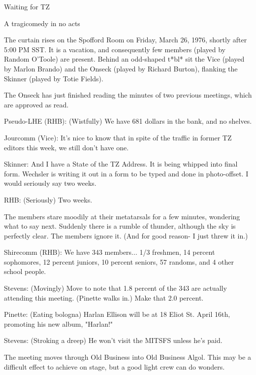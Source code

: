 \documentclass[12pt]{article}
\begin{document}
\begin{center}

Waiting for TZ

A tragicomedy in no acts

\end{center}
 
\vspace{12pt}

\setlength{\parskip}{6pt}

\noindent
The curtain rises on the Spofford Room on Friday, March 26, 1976, shortly after 5:00 PM SST. It is a vacation, and consequently few members (played by Random O'Toole) are present. Behind an odd-shaped t*bl* sit the Vice (played by Marlon Brando) and the Onseck (played by Richard Burton), flanking the Skinner (played by Totie Fields).

The Onseck has just finished reading the minutes of two previous meetings, which are approved as read.

Pseudo-LHE (RHB): (Wistfully) We have 681 dollars in the bank, and no shelves.

Jourcomm (Vice): It's nice to know that in spite of the traffic in former TZ editors this week, we still don't have one.

Skinner: And I have a State of the TZ Address. It is being whipped into final form. Wechsler is writing it out in a form to be typed and done in photo-offset. I would seriously say two weeks.

RHB: (Seriously) Two weeks.

The members stare moodily at their metatarsals for a few minutes, wondering what to say next. Suddenly there is a rumble of thunder, although the sky is perfectly clear. The members ignore it. (And for good reason- I just threw it in.)

Shirecomm (RHB): We have 343 members... 1/3 freshmen, 14 percent sophomores, 12 percent juniors, 10 percent seniors, 57 randoms, and 4 other school people.

Stevens: (Movingly) Move to note that 1.8 percent of the 343 are actually attending this meeting. (Pinette walks in.) Make that 2.0 percent.

Pinette: (Eating bologna) Harlan Ellison will be at 18 Eliot St. April 16th, promoting his new album, "Harlan!"

Stevens: (Stroking a dreep) He won't visit the MITSFS unless he's paid.

The meeting moves through Old Business into Old Business Algol. This may be a difficult effect to achieve on stage, but a good light crew can do wonders.
\end{document}
